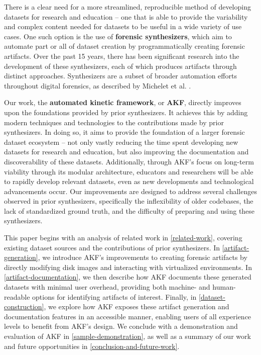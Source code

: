 There is a clear need for a more streamlined, reproducible method of
developing datasets for research and education -- one that is able to
provide the variability and complex content needed for datasets to be
useful in a wide variety of use cases. One such option is the use of
\textbf{forensic synthesizers}, which aim to automate part or all of
dataset creation by programmatically creating forensic artifacts. Over
the past 15 years, there has been significant research into the
development of these synthesizers, each of which produces artifacts
through distinct approaches. Synthesizers are a subset of broader
automation efforts throughout digital forensics, as described by
Michelet et al. \citep{micheletAutomationDigitalForensics2023}.

Our work, the \textbf{automated kinetic framework}, or \textbf{AKF},
directly improves upon the foundations provided by prior synthesizers.
It achieves this by adding modern techniques and technologies to the
contributions made by prior synthesizers. In doing so, it aims to
provide the foundation of a larger forensic dataset ecosystem -- not
only vastly reducing the time spent developing new datasets for research
and education, but also improving the documentation and discoverability
of these datasets. Additionally, through AKF's focus on long-term
viability through its modular architecture, educators and researchers
will be able to rapidly develop relevant datasets, even as new
developments and technological advancements occur. Our improvements are
designed to address several challenges observed in prior synthesizers,
specifically the inflexibility of older codebases, the lack of
standardized ground truth, and the difficulty of preparing and using
these synthesizers.

This paper begins with an analysis of related work in \autoref{related-work}, covering existing dataset sources and the contributions of prior
synthesizers. In \autoref{artifact-generation}, we introduce AKF's
improvements to creating forensic artifacts by directly modifying disk
images and interacting with virtualized environments. In
\autoref{artifact-documentation}, we then describe how AKF documents
these generated datasets with minimal user overhead, providing both
machine- and human-readable options for identifying artifacts of
interest. Finally, in \autoref{dataset-construction}, we explore how
AKF exposes these artifact generation and documentation features in an
accessible manner, enabling users of all experience levels to benefit
from AKF's design. We conclude with a demonstration and evaluation of
AKF in \autoref{sample-demonstration}, as well as a summary of our work
and future opportunities in \autoref{conclusion-and-future-work}.

